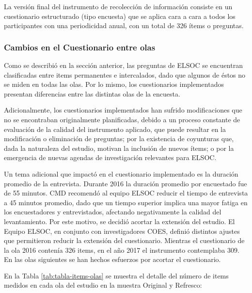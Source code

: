 \documentclass[
  12pt,
]{article}
\begin{document}
La versión final del instrumento de recolección de información consiste en un cuestionario estructurado (tipo encuesta) que se aplica cara a cara a todos los participantes con una periodicidad anual, con un total de 326 ítems o preguntas.

\hypertarget{dif-cuest-olas}{%
\subsubsection*{Cambios en el Cuestionario entre olas}\label{dif-cuest-olas}}

Como se describió en la sección anterior, las preguntas de ELSOC se encuentran clasificadas entre items permanentes e intercalados, dado que algunos de éstos no se miden en todas las olas. Por lo mismo, los cuestionarios implementados presentan diferencias entre las distintas olas de la encuesta.

Adicionalmente, los cuestionarios implementados han sufrido modificaciones que no se encontraban originalmente planificadas, debido a un proceso constante de evaluación de la calidad del instrumento aplicado, que puede resultar en la modificación o eliminación de preguntas; por la existencia de coyunturas que, dada la naturaleza del estudio, motivan la inclusión de nuevos ítems; o por la emergencia de nuevas agendas de investigación relevantes para ELSOC.

Un tema adicional que impactó en el cuestionario implementado es la duración promedio de la entrevista. Durante 2016 la duración promedio por encuestado fue de 55 minutos. CMD recomendó al equipo ELSOC reducir el tiempo de entrevista a 45 minutos promedio, dado que un tiempo superior implica una mayor fatiga en los encuestadores y entrevistados, afectando negativamente la calidad del levantamiento. Por este motivo, se decidió acortar la extensión del estudio. El Equipo ELSOC, en conjunto con investigadores COES, definió distintos ajustes que permitieron reducir la extensión del cuestionario. Mientras el cuestionario de la ola 2016 contenía 326 items, en el año 2017 el instrumento contemplaba 309. En las olas siguientes se han hechos esfuerzos por acortar el cuestionario.

En la Tabla \ref{tab:tabla-items-olas} se muestra el detalle del número de items medidos en cada ola del estudio en la muestra Original y Refresco:
\end{document}
